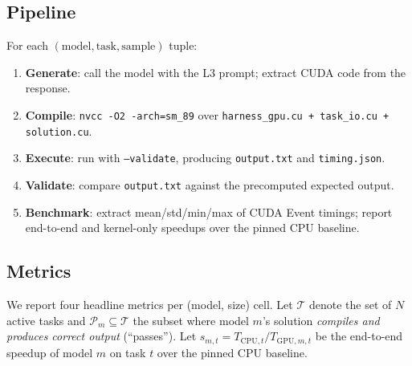 \documentclass{article}
\begin{document}
\subsection{Pipeline}
For each \((\text{model}, \text{task}, \text{sample})\) tuple:
\begin{enumerate}
  \item \textbf{Generate}: call the model with the L3 prompt; extract CUDA code from the response.
  \item \textbf{Compile}: \texttt{nvcc -O2 -arch=sm\_89} over \texttt{harness\_gpu.cu + task\_io.cu + solution.cu}.
  \item \textbf{Execute}: run with \texttt{--validate}, producing \texttt{output.txt} and \texttt{timing.json}.
  \item \textbf{Validate}: compare \texttt{output.txt} against the precomputed expected output.
  \item \textbf{Benchmark}: extract mean/std/min/max of CUDA Event timings; report end-to-end and kernel-only speedups over the pinned CPU baseline.
\end{enumerate}

\subsection{Metrics}
\label{sec:metrics}

We report four headline metrics per (model, size) cell. Let $\mathcal{T}$
denote the set of $N$ active tasks and $\mathcal{P}_m \subseteq \mathcal{T}$
the subset where model $m$'s solution \emph{compiles and produces correct
output} (``passes''). Let $s_{m,t} = T_{\mathrm{CPU},t} / T_{\mathrm{GPU},m,t}$
be the end-to-end speedup of model $m$ on task $t$ over the pinned CPU
baseline.
\end{document}
